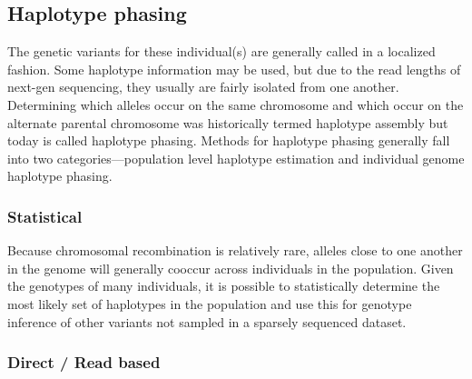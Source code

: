 \subsection{Haplotype phasing}

\par{
The genetic variants for these individual(s) are generally called in a localized fashion. Some haplotype information may be used, but due to the read lengths of next-gen sequencing, they usually are fairly isolated from one another. Determining which alleles occur on the same chromosome and which occur on the alternate parental chromosome was historically termed haplotype assembly but today is called haplotype phasing. Methods for haplotype phasing generally fall into two categories---population level haplotype estimation and individual genome haplotype phasing. 
}

\subsubsection{Statistical}

\par{
Because chromosomal recombination is relatively rare, alleles close to one another in the genome will generally cooccur across individuals in the population. Given the genotypes of many individuals, it is possible to statistically determine the most likely set of haplotypes in the population\cite{shapeit4} and use this for genotype inference of other variants not sampled in a sparsely sequenced dataset.
}

\subsubsection{Direct / Read based}

